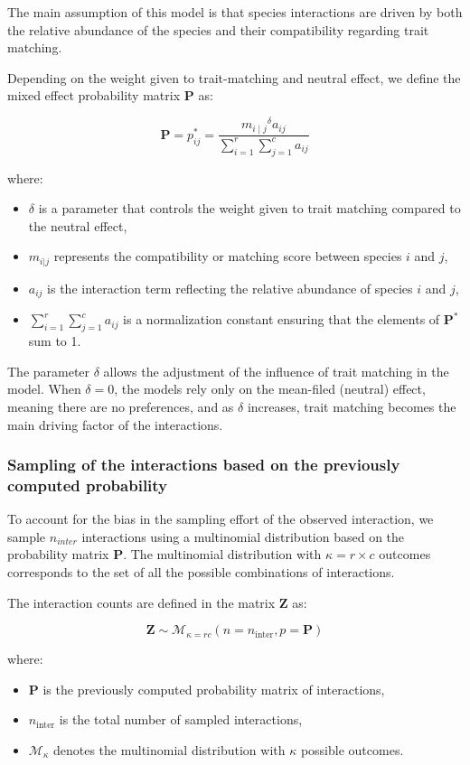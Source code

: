 The main assumption of this model is that species interactions are driven by both the relative abundance of the species and their compatibility regarding trait matching.

Depending on the weight given to trait-matching and neutral effect, we define the mixed effect probability matrix $\mathbf{P}$ as: 

$$
    \mathbf{P} = p^*_{ij} = \frac{{m_{i\mid j}}^\delta a_{ij}}{\sum_{i=1}^{r} \sum_{j=1}^{c}a_{ij}}
$$
    
where:
\begin{itemize}
\item  $\delta$ is a parameter that controls the weight given to trait matching compared to the neutral effect,
\item  $m_{i|j}$ represents the compatibility or matching score between species \(i\) and \(j\),
\item  $a_{ij}$ is the interaction term reflecting the relative abundance of species \(i\) and \(j\),
\item  $\sum_{i=1}^{r} \sum_{j=1}^{c}a_{ij}$ is a normalization constant ensuring that the elements of \(\mathbf{P}^*\) sum to 1.
\end{itemize}

The parameter $\delta$ allows the adjustment of the influence of trait matching in the model. When $\delta = 0$, the models rely only on the mean-filed (neutral) effect, meaning there are no preferences, and as $\delta$ increases, trait matching becomes the main driving factor of the interactions.



\subsubsection{Sampling of the interactions based on the previously computed probability}

To account for the bias in the sampling effort of the observed interaction, we sample $n_{inter}$ interactions using a multinomial distribution based on the probability matrix $\mathbf{P}$. The multinomial distribution with $\kappa = r \times c$ outcomes corresponds to the set of all the possible combinations of interactions.

The interaction counts are defined in the matrix $\mathbf{Z}$ as:

$$
    \mathbf{Z} \sim \mathcal{M}_{\kappa = rc}(n = n_\text{inter}, p = \mathbf{P})
$$

where:
\begin{itemize}
    \item $\mathbf{P}$ is the previously computed probability matrix of interactions,
    \item  $n_{\text{inter}}$ is the total number of sampled interactions,
    \item  $\mathcal{M}_{\kappa}$ denotes the multinomial distribution with \(\kappa\) possible outcomes.
\end{itemize}



